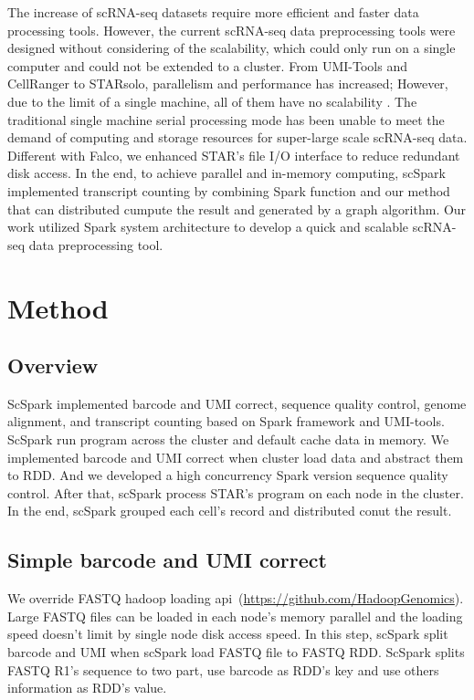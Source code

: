 \documentclass[conference]{IEEEtran}
\begin{document}
The increase of scRNA-seq datasets require more efficient and faster data processing tools. However, the current scRNA-seq data preprocessing tools were designed without considering of the scalability, which could only run on a single computer and could not be extended to a cluster. From UMI-Tools and CellRanger to STARsolo, parallelism and performance has increased; However, due to the limit of a single machine, all of them have no scalability . 
The traditional single machine serial processing mode has been unable to meet the demand of computing and storage resources for super-large scale scRNA-seq data.
Different with Falco, we enhanced STAR's file I/O interface to reduce redundant disk access.
In the end, to achieve parallel and in-memory computing, scSpark implemented transcript counting by combining Spark function and our method that can distributed cumpute the result and generated by a graph algorithm.
Our work utilized Spark system architecture to develop a quick and scalable scRNA-seq data preprocessing tool. 

\section{Method}
\subsection{Overview}
ScSpark implemented barcode and UMI correct, sequence quality control, genome alignment, and transcript counting based on Spark framework and UMI-tools. 
ScSpark run program across the cluster and default cache data in memory. 
We implemented barcode and UMI correct when cluster load data and abstract them to RDD.
And we developed a high concurrency Spark version sequence quality control. 
After that, scSpark process STAR's program on each node in the cluster.
In the end, scSpark grouped each cell's record and distributed conut the result.

\subsection{Simple barcode and UMI correct}
We override FASTQ hadoop loading api~(\url{https://github.com/HadoopGenomics}).
Large FASTQ files can be loaded in each node's memory parallel and the loading speed doesn't limit by single node disk access speed.
In this step, scSpark split barcode and UMI when scSpark load FASTQ file to FASTQ RDD.
ScSpark splits FASTQ R1's sequence to two part, use barcode as RDD's key and use others information as RDD's value.
\end{document}
